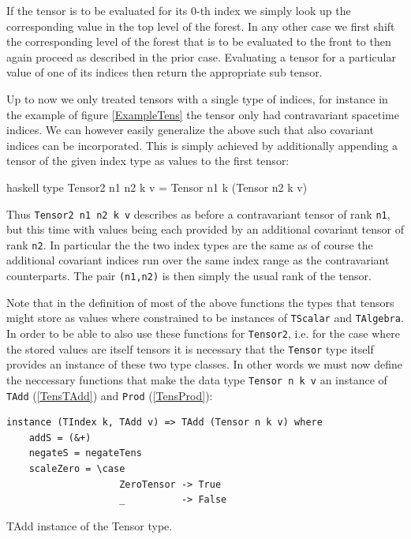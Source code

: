 \documentclass[a4paper,12pt, DIV=14, BCOR=5mm, twoside, headsepline, numbers=noenddot]{scrbook}
\begin{document}
If the tensor is to be evaluated for its 0-th index we simply look up the corresponding value in the top level of the forest. In any other case we first shift the corresponding level of the forest that is to be evaluated to the front to then again proceed as described in the prior case. Evaluating a tensor for a particular value of one of its indices then return the appropriate sub tensor. 

Up to now we only treated tensors with a single type of indices, for instance in the example of figure \ref{ExampleTens} the tensor only had contravariant spacetime indices. We can however easily generalize the above such that also covariant indices can be incorporated. This is simply achieved by additionally appending a tensor of the given index type as values
to the first tensor:
\begin{center}
\begin{cminted}{haskell}
type Tensor2 n1 n2 k v = Tensor n1 k (Tensor n2 k v)
\end{cminted}
\end{center}
Thus \texttt{Tensor2 n1 n2 k v} describes as before a contravariant tensor of rank \texttt{n1}, but this time with values being each provided by an additional covariant tensor of rank \texttt{n2}. In particular the the two index types are the same as of course the additional covariant indices run over the same index range as the contravariant counterparts. The pair \texttt{(n1,n2)} is then simply the usual rank of the tensor.

Note that in the definition of most of the above functions the types that tensors might store as values where constrained to be instances of \texttt{TScalar} and \texttt{TAlgebra}. 
In order to be able to also use these functions for  \texttt{Tensor2}, i.e. for the case where the stored values are itself tensors it is necessary that the \texttt{Tensor} type itself provides an instance of these two type classes. In other words we must now define the neccessary functions that make the data type
\texttt{Tensor n k v} an instance of \texttt{TAdd} (\ref{TensTAdd}) and \texttt{Prod} (\ref{TensProd}):

\begin{listing}[hbt!] 
\begin{verbatim}
instance (TIndex k, TAdd v) => TAdd (Tensor n k v) where
    addS = (&+)
    negateS = negateTens
    scaleZero = \case
                    ZeroTensor -> True
                    _          -> False
\end{verbatim}
\caption{TAdd instance of the Tensor type.}\label{TensTAdd}
\end{listing}
\end{document}
